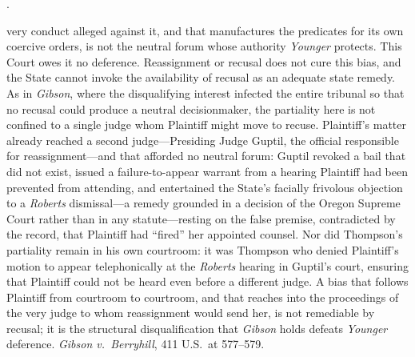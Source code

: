 \documentclass[12pt,letterpaper]{article}
\newcounter{complaintpara}
\newenvironment{paras}{%
	\begin{list}{\arabic{complaintpara}.}{%
			\setlength{\leftmargin}{0.5in}%
			\setlength{\labelwidth}{0.4in}%
			\setlength{\labelsep}{0.1in}%
			\setlength{\itemsep}{0pt}%
			\setlength{\parsep}{0pt}%
			\setlength{\topsep}{6pt}%
		}%
	}{%
	\end{list}%
}
\begin{document}
\begin{paras}
very conduct alleged against it, and that manufactures the predicates for its own coercive orders, is not the neutral forum whose authority \textit{Younger} protects. This Court owes it no deference. Reassignment or recusal does not cure this bias, and the State cannot invoke the availability of recusal as an adequate state remedy. As in \textit{Gibson}, where the disqualifying interest infected the entire tribunal so that no recusal could produce a neutral decisionmaker, the partiality here is not confined to a single judge whom Plaintiff might move to recuse. Plaintiff's matter already reached a second judge---Presiding Judge Guptil, the official responsible for reassignment---and that afforded no neutral forum: Guptil revoked a bail that did not exist, issued a failure-to-appear warrant from a hearing Plaintiff had been prevented from attending, and entertained the State's facially frivolous objection to a \textit{Roberts} dismissal---a remedy grounded in a decision of the Oregon Supreme Court rather than in any statute---resting on the false premise, contradicted by the record, that Plaintiff had ``fired'' her appointed counsel. Nor did Thompson's partiality remain in his own courtroom: it was Thompson who denied Plaintiff's motion to appear telephonically at the \textit{Roberts} hearing in Guptil's court, ensuring that Plaintiff could not be heard even before a different judge. A bias that follows Plaintiff from courtroom to courtroom, and that reaches into the proceedings of the very judge to whom reassignment would send her, is not remediable by recusal; it is the structural disqualification that \textit{Gibson} holds defeats \textit{Younger} deference. \textit{Gibson v.\ Berryhill}, 411 U.S.\ at 577--579.
	\end{paras}
\end{document}
